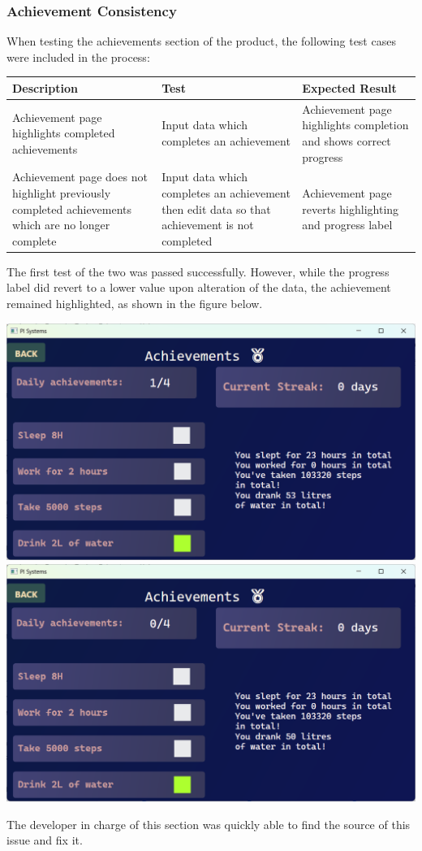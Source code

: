 \documentclass[12pt]{article}
\begin{document}
\subsubsection{Achievement Consistency}
When testing the achievements section of the product, the following test 
cases were included in the process:\par
\begin{center}
    \begin{tabular}{|p{5cm}|p{5cm}|p{5cm}|}
        \hline
        \textbf{Description} & \textbf{Test} & \textbf{Expected Result}\\
        \hline
        Achievement page highlights completed achievements & Input data which 
        completes an achievement & Achievement page highlights completion and 
        shows correct progress \\
        \hline
        Achievement page does not highlight previously completed achievements 
        which are no longer complete & Input data which completes an achievement 
        then edit data so that achievement is not completed & Achievement page 
        reverts highlighting and progress label\\
        \hline
    \end{tabular}
\end{center}
The first test of the two was passed successfully. However, while the progress 
label did revert to a lower value upon alteration of the data, the achievement 
remained highlighted, as shown in the figure below.\par
\begin{center}
    \includegraphics[width=0.45\linewidth]{achievementCorrect.png}
    \includegraphics[width=0.45\linewidth]{achievementIncorrect.png}
\end{center}
The developer in charge of this section was quickly able to find the source of 
this issue and fix it.\par
\end{document}
